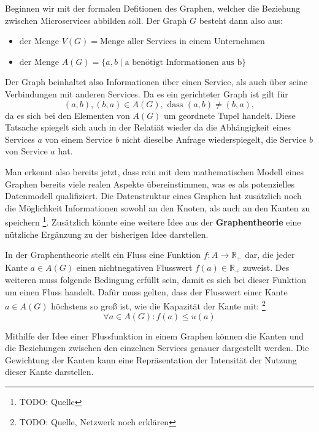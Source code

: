 \documentclass[
	12pt,
	BCOR=5mm,
	DIV=12,
	headinclude=on,
	footinclude=off,
	parskip=half,
	bibliography=totoc,
	listof=entryprefix,
	toc=listof,
	numbers=noenddot,
	plainfootsepline
]{scrreprt}
\begin{document}
\begin{example}
	Beginnen wir mit der formalen Defitionen des Graphen, welcher die Beziehung zwischen Microservices abbilden soll. Der Graph $G$ besteht dann also aus: 
	\begin{itemize}
		\item der Menge $V(G)=\text{Menge aller Services in einem Unternehmen}$
		\item der Menge $A(G)=\{a,b \mid \text{a benötigt Informationen aus b}\}$
	\end{itemize}
	Der Graph beinhaltet also Informationen über einen Service, als auch über seine Verbindungen mit anderen Services. Da es ein gerichteter Graph ist gilt für $$(a,b), (b,a) \in A(G),\text{ dass }(a,b) \neq (b,a),$$ da es sich bei den Elementen von $A(G)$ um geordnete Tupel handelt. Diese Tatsache spiegelt sich auch in der Relatiät wieder da die Abhängigkeit eines Services $a$ von einem Service $b$ nicht dieselbe Anfrage wiederspiegelt, die Service $b$ von Service $a$ hat.
\end{example}\label{exp:microserviceGraph}

Man erkennt also bereits jetzt, dass rein mit dem mathematischen Modell eines Graphen bereits viele realen Aspekte übereinstimmen, was es als potenzielles Datenmodell qualifiziert. Die Datenstruktur eines Graphen hat zusätzlich noch die Möglichkeit Informationen sowohl an den Knoten, als auch an den Kanten zu speichern \footnote{TODO: Quelle}. Zusätzlich könnte eine weitere Idee aus der \textbf{Graphentheorie} eine nützliche Ergänzung zu der bisherigen Idee darstellen.

\begin{definition}[Fluss]
	In der Graphentheorie stellt ein Fluss eine Funktion $f: A \rightarrow \mathbb{R_+}$ dar, die jeder Kante $a \in A(G)$ einen nichtnegativen Flusswert $f(a) \in \mathbb{R_+}$ zuweist. Des weiteren muss folgende Bedingung erfüllt sein, damit es sich bei dieser Funktion um einen Fluss handelt. Dafür muss gelten, dass der Flusswert einer Kante $a \in A(G)$ höchstens so groß ist, wie die Kapazität der Kante mit: \footnote{TODO: Quelle, Netzwerk noch erklären} $$\forall a \in A(G): f(a) \leq u(a)$$
\end{definition}

Mithilfe der Idee einer Flussfunktion in einem Graphen können die Kanten und die Beziehungen zwischen den einzelnen Services genauer dargestellt werden. Die Gewichtung der Kanten kann eine Repräsentation der Intensität der Nutzung dieser Kante darstellen.
\end{document}
